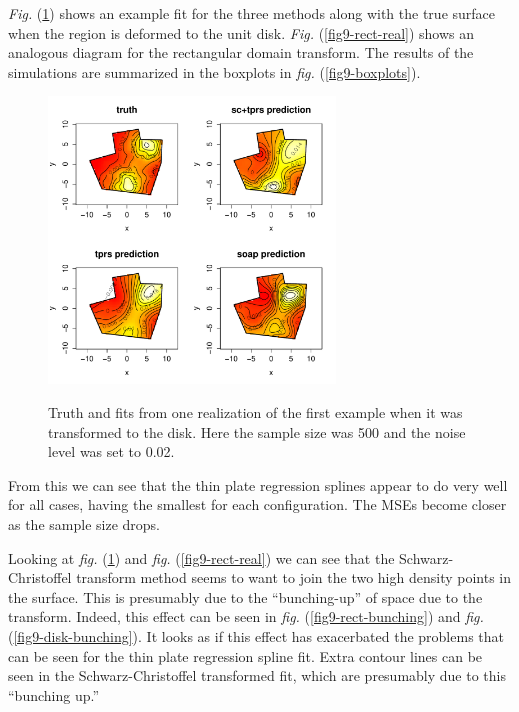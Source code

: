 \documentclass[a4paper,10pt]{amsart}
\newcommand{\sch}{Schwarz-Christoffel }
\newcommand{\fig}[1]{\emph{fig.} (\ref{#1})}
\newcommand{\Fig}[1]{\emph{Fig.} (\ref{#1})}
\begin{document}
\Fig{fig9-disk-real} shows an example fit for the three methods along with the true surface when the region is deformed to the unit disk. \Fig{fig9-rect-real} shows an analogous diagram for the rectangular domain transform. The results of the simulations are summarized in the boxplots in \fig{fig9-boxplots}.

\begin{figure}[tbp]
\centering
\includegraphics[width=3in]{figs-otherdomains/fig9-disk-real.pdf} \\
\caption{Truth and fits from one realization of the first example when it was transformed to the disk. Here the sample size was 500 and the noise level was set to 0.02.}
\label{fig9-disk-real}
\end{figure}

From this we can see that the thin plate regression splines appear to do very well for all cases, having the smallest for each configuration. The MSEs become closer as the sample size drops.

Looking at \fig{fig9-disk-real} and \fig{fig9-rect-real} we can see that the \sch transform method seems to want to join the two high density points in the surface. This is presumably due to the ``bunching-up'' of space due to the transform. Indeed, this effect can be seen in \fig{fig9-rect-bunching} and \fig{fig9-disk-bunching}. It looks as if this effect has exacerbated the problems that can be seen for the thin plate regression spline fit. Extra contour lines can be seen in the \sch transformed fit, which are presumably due to this ``bunching up.''
\end{document}
